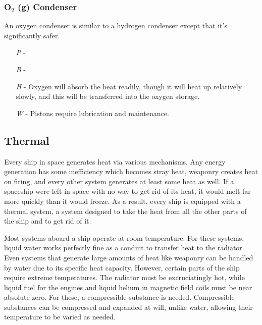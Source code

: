 \documentclass[a4paper]{article}
\begin{document}
\vspace{-0.5cm} \hspace{-18pt} \subsubsection{O$_2$ (g) Condenser} \label{engine_o2_condenser} \vspace{-0.2cm}
An oxygen condenser is similar to a hydrogen condenser except that it's significantly safer.
\begin{enumerate}
\item [\textit{P}] -  \\
\item [\textit{B}] -  \\
\item [\textit{H}] - Oxygen will absorb the heat readily, though it will heat up relatively slowly, and this will be transferred into the oxygen storage.
\item [\textit{W}] - Pistons require lubrication and maintenance.
\end{enumerate}

\subsection{Thermal} \label{thermal}

Every ship in space generates heat via various mechanisms. Any energy generation has some inefficiency which becomes stray heat, weaponry creates heat on firing, and every other system generates at least some heat as well. If a spaceship were left in space with no way to get rid of its heat, it would melt far more quickly than it would freeze. As a result, every ship is equipped with a thermal system, a system designed to take the heat from all the other parts of the ship and to get rid of it.

Most systems aboard a ship operate at room temperature. For these systems, liquid water works perfectly fine as a conduit to transfer heat to the radiator. Even systems that generate large amounts of heat like weaponry can be handled by water due to its specific heat capacity. However, certain parts of the ship require extreme temperatures. The radiator must be excruciatingly hot, while liquid fuel for the engines and liquid helium in magnetic field coils must be near absolute zero. For these, a compressible substance is needed. Compressible substances can be compressed and expanded at will, unlike water, allowing their temperature to be varied as needed.
\end{document}
